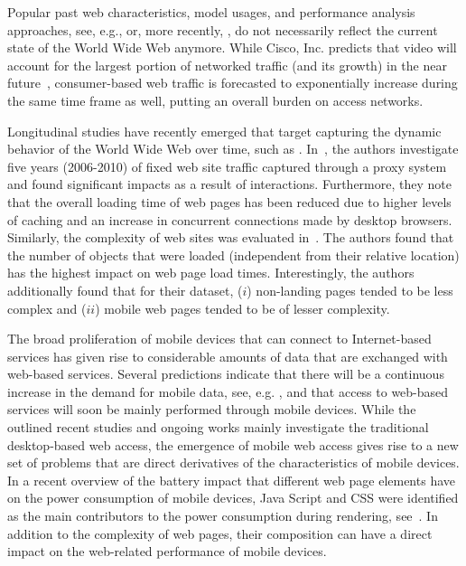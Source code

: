\documentclass[journal,final]{IEEEtran}
\begin{document}
Popular past web characteristics, model usages, and performance analysis approaches, see, e.g., \cite{BaCr98} or, more recently, \cite{LiZhZhChGr10}, do  not necessarily reflect the current state of the World Wide Web anymore.
While Cisco, Inc. predicts that video will account for the largest portion of networked traffic (and its growth) in the near future~\cite{Ci13}, consumer-based web traffic is forecasted to exponentially increase during the same time frame as well, putting an overall burden on access networks.

Longitudinal studies have recently emerged that target capturing the dynamic behavior of the World Wide Web over time, such as \cite{CaAlPa10}.
In~\cite{IhPa11}, the authors investigate five years (2006-2010) of fixed web site traffic captured through a proxy system and found significant impacts as a result of interactions.
Furthermore, they note that the overall loading time of web pages has been reduced due to higher levels of caching and an increase in concurrent connections made by desktop browsers.
Similarly, the complexity of web sites was evaluated in~\cite{BuMaSe11,BuMaSe13}. The authors found that the number of objects that were loaded (independent from their relative location) has the highest impact on web page load times.
Interestingly, the authors additionally found that for their dataset, ($i$) non-landing pages tended to be less complex and ($ii$) mobile web pages tended to be of lesser complexity.


The broad proliferation of mobile devices that can connect to Internet-based services has given rise to considerable amounts of data that are exchanged with web-based services. 
Several predictions indicate that there will be a continuous increase in the demand for mobile data, see, e.g. \cite{Ci13}, and that access to web-based services will soon be mainly performed through mobile devices.
While the outlined recent studies and ongoing works mainly investigate the traditional desktop-based web access, the emergence of mobile web access gives rise to a new set of problems that are direct derivatives of the characteristics of mobile devices.
In a recent overview of the battery impact that different web page elements have on the power consumption of mobile devices, Java Script and CSS were identified as the main contributors to the power consumption during rendering, see~\cite{ThAgNiBoSi12}.
In addition to the complexity of web pages, their composition can have a direct impact on the web-related performance of mobile devices.
\end{document}
